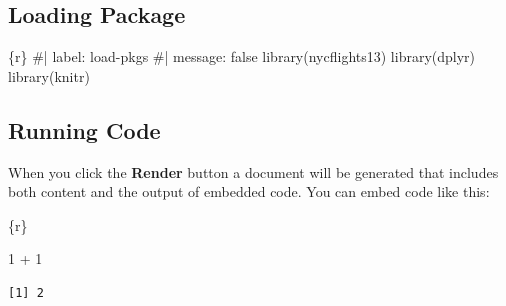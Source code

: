 \documentclass[
  letterpaper,
  DIV=11,
  numbers=noendperiod]{scrreprt}
\newenvironment{Shaded}{\begin{snugshade}}{\end{snugshade}}
\newcommand{\CommentTok}[1]{\textcolor[rgb]{0.37,0.37,0.37}{#1}}
\newcommand{\DecValTok}[1]{\textcolor[rgb]{0.68,0.00,0.00}{#1}}
\newcommand{\FunctionTok}[1]{\textcolor[rgb]{0.28,0.35,0.67}{#1}}
\newcommand{\InformationTok}[1]{\textcolor[rgb]{0.37,0.37,0.37}{#1}}
\newcommand{\NormalTok}[1]{\textcolor[rgb]{0.00,0.23,0.31}{#1}}
\newcommand{\SpecialCharTok}[1]{\textcolor[rgb]{0.37,0.37,0.37}{#1}}
\begin{document}
\begin{tcolorbox}[enhanced jigsaw, toptitle=1mm, colback=white, arc=.35mm, rightrule=.15mm, titlerule=0mm, left=2mm, breakable, bottomtitle=1mm, bottomrule=.15mm, leftrule=.75mm, title={Task 6 (message: false is `Challenge')}, colframe=quarto-callout-important-color-frame, opacitybacktitle=0.6, toprule=.15mm, colbacktitle=quarto-callout-important-color!10!white, coltitle=black, opacityback=0]

\hypertarget{loading-package}{%
\subsection*{Loading Package}\label{loading-package}}

\begin{Shaded}
\begin{Highlighting}[]
\InformationTok{\textasciigrave{}\textasciigrave{}\textasciigrave{}\{r\}}
\CommentTok{\#| label: load{-}pkgs}
\CommentTok{\#| message: false}
\FunctionTok{library}\NormalTok{(nycflights13)}
\FunctionTok{library}\NormalTok{(dplyr)}
\FunctionTok{library}\NormalTok{(knitr)}
\InformationTok{\textasciigrave{}\textasciigrave{}\textasciigrave{}}
\end{Highlighting}
\end{Shaded}

\end{tcolorbox}

\hypertarget{running-code}{%
\subsection*{Running Code}\label{running-code}}

When you click the \textbf{Render} button a document will be generated
that includes both content and the output of embedded code. You can
embed code like this:

\begin{Shaded}
\begin{Highlighting}[]
\InformationTok{\textasciigrave{}\textasciigrave{}\textasciigrave{}\{r\}}

\DecValTok{1} \SpecialCharTok{+} \DecValTok{1}
\InformationTok{\textasciigrave{}\textasciigrave{}\textasciigrave{}}
\end{Highlighting}
\end{Shaded}

\begin{verbatim}
[1] 2
\end{verbatim}
\end{document}

